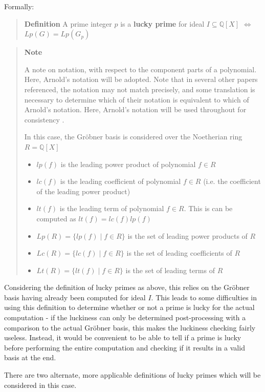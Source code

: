 \documentclass[letterpaper,12pt,titlepage,oneside,final]{book}
\newenvironment{defn}{\begin{quote}%
  \textbf{Definition }%
  \quad
}{%
\end{quote}%
}
\newenvironment{note}{\begin{quote}%
  \textbf{Note }%
  \quad
}{%
\end{quote}%
}
\begin{document}
Formally: 
\begin{defn}\label{Lucky Primes}
  A prime integer ${p}$ is a \textbf{lucky prime} for ideal ${I \subseteq \mathbb{Q}[X]}$ ${\iff}$ ${Lp(G) = Lp(G_p)}$ \hfill \cite{Arnold}
\end{defn}

\begin{note}
  A note on notation, with respect to the component parts of a polynomial.  Here, Arnold's notation will be adopted.  Note that in several other papers referenced, the notation may not match precisely, and some translation is necessary to determine which of their notation is equivalent to which of Arnold's notation.  Here, Arnold's notation will be used throughout for consistency \cite{Arnold}.  

  In this case, the Gr\"obner basis is considered over the Noetherian ring ${R = \mathbb{Q}[X]}$ 
  \begin{itemize}
    \item ${lp(f)}$ is the leading power product of polynomial ${f \in R}$
    \item ${lc(f)}$ is the leading coefficient of polynomial ${f \in R}$ (i.e. the coefficient of the leading power product)
    \item ${lt(f)}$ is the leading term of polynomial ${f \in R}$.  This is can be computed as ${lt(f) = lc(f)lp(f)}$ 
    \item ${Lp(R) = \{lp(f) \mid f \in R\}}$ is the set of leading power products of ${R}$
    \item ${Lc(R) = \{lc(f) \mid f \in R\}}$ is the set of leading coefficients of ${R}$
    \item ${Lt(R) = \{lt(f) \mid f \in R\}}$ is the set of leading terms of ${R}$
  \end{itemize}
\end{note}

Considering the definition of lucky primes as above, this relies on the Gr\"obner basis having already been computed for ideal ${I}$.  This leads to some difficulties in using this definition to determine whether or not a prime is lucky for the actual computation - if the luckiness can only be determined post-processing with a comparison to the actual Gr\"obner basis, this makes the luckiness checking fairly useless.  Instead, it would be convenient to be able to tell if a prime is lucky before performing the entire computation and checking if it results in a valid basis at the end.  

There are two alternate, more applicable definitions of lucky primes which will be considered in this case.
\end{document}
